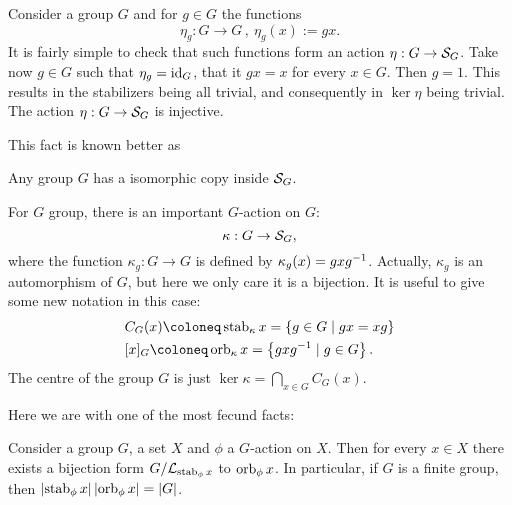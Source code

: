 \begin{example}
Consider a group \(G\) and for \(g \in G\) the functions
\[\eta_g : G \to G\,, \ \eta_g(x) := gx .\]
It is fairly simple to check that such functions form an action \(\eta : G \to \mathcal S_G\). Take now \(g \in G\) such that \(\eta_g = \text{id}_G\), that it \(gx = x\) for every \(x \in G\). Then \(g = 1\). This results in the stabilizers being all trivial, and consequently in \(\ker \eta\) being trivial. The action \(\eta : G \to \mathcal S_G\) is injective.
\end{example}

This fact is known better as

\begin{proposition}
Any group \(G\) has a isomorphic copy inside \(\mathcal S_G\).
\end{proposition}


\begin{example}
For \(G\) group, there is an important \(G\)-action on \(G\):
\[\kappa : G \to \mathcal S_G ,\]
where the function \(\kappa_g : G \to G\) is defined by \(\kappa_g(x) = g xg^{-1}\). Actually, \(\kappa_g\) is an automorphism of \(G\), but here we only care it is a bijection. It is useful to give some new notation in this case:
\begin{align*}
& C_G(x) \coloneq \stab_\kappa x = \set{g \in G \mid gx = xg} \\
& [x]_G \coloneq \orb_\kappa x = \set{g x \inv g \mid g \in G} .
\end{align*}
The centre of the group \(G\) is just \(\ker \kappa = \bigcap_{x \in G} C_G(x)\).
\end{example}

Here we are with one of the most fecund facts:

\begin{proposition}\label{prop:OrbsStabsCosets}
Consider a group \(G\), a set \(X\) and \(\phi\) a \(G\)-action on \(X\). Then for every \(x \in X\) there exists a bijection form \(G/\mathcal L_{\operatorname{stab}_\phi x}\) to \(\operatorname{orb}_\phi x\). In particular, if \(G\) is a finite group, then \(\left\lvert\operatorname{stab}_\phi x\right\rvert \left\lvert\operatorname{orb}_\phi x\right\rvert = \left\lvert G\right\rvert\).
\end{proposition}

